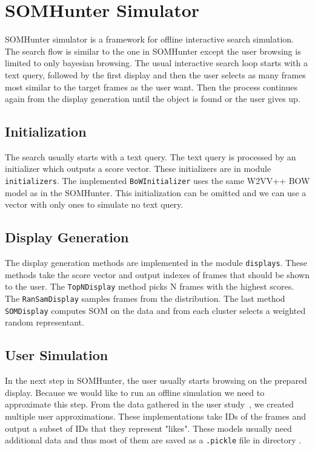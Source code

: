 \chapter{SOMHunter Simulator}
\label{somhunter-simulator}


SOMHunter simulator is a framework for offline interactive search simulation. The search flow is similar to the one in SOMHunter except the user browsing is limited to only bayesian browsing. The usual interactive search loop starts with a text query, followed by the first display and then the user selects as many frames most similar to the target frames as the user want. Then the process continues again from the display generation until the object is found or the user gives up.

\section{Initialization}

The search usually starts with a text query. The text query is processed by an initializer which outputs a score vector. These initializers are in module \lstinline{initializers}. The implemented \lstinline{BoWInitializer} uses the same W2VV++ BOW model as in the SOMHunter. This initialization can be omitted and we can use a vector with only ones to simulate no text query.

\section{Display Generation}

The display generation methods are implemented in the module \lstinline{displays}. These methods take the score vector and output indexes of frames that should be shown to the user. The \lstinline{TopNDisplay} method picks N frames with the highest scores. The \lstinline{RanSamDisplay} samples frames from the distribution. The last method \lstinline{SOMDisplay} computes SOM on the data and from each cluster selects a weighted random representant. 

\section{User Simulation}

In the next step in SOMHunter, the user usually starts browsing on the prepared display. Because we would like to run an offline simulation we need to approximate this step. From the data gathered in the user study~\cite{peska2021}, we created multiple user approximations. These implementations take IDs of the frames and output a subset of IDs that they represent "likes". These models usually need additional data and thus most of them are saved as a \lstinline{.pickle} file in directory .

